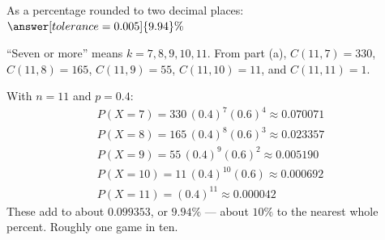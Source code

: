 \documentclass[12pt]{ximera}
\begin{document}
\begin{problem}
\begin{prompt}
As a percentage rounded to two decimal places: $\answer[tolerance=0.005]{9.94}\%$

\begin{hint}
``Seven or more'' means $k=7,8,9,10,11$. From part (a), $C(11,7)=330$, $C(11,8)=165$,
$C(11,9)=55$, $C(11,10)=11$, and $C(11,11)=1$.
\end{hint}

\begin{feedback}
With $n=11$ and $p=0.4$:
\[
\begin{array}{ll}
P(X=7)=330\,(0.4)^7(0.6)^4 \approx 0.070071\\
P(X=8)=165\,(0.4)^8(0.6)^3 \approx 0.023357\\
P(X=9)=55\,(0.4)^9(0.6)^2 \approx 0.005190\\
P(X=10)=11\,(0.4)^{10}(0.6) \approx 0.000692\\
P(X=11)=(0.4)^{11} \approx 0.000042
\end{array}
\]
These add to about $0.099353$, or $9.94\%$ --- about $10\%$ to the nearest whole
percent. Roughly one game in ten.
\end{feedback}
\end{prompt}
\end{problem}
\end{document}
